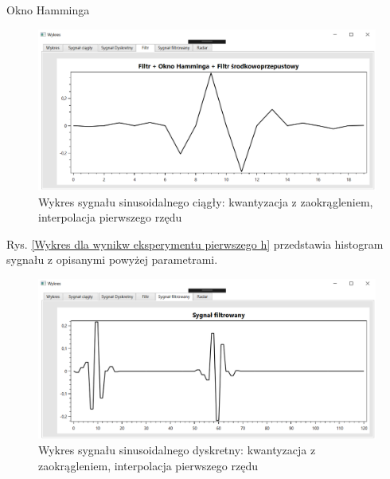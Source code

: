 \documentclass[12pt]{article}
\begin{document}
\newpage
Okno Hamminga
\begin{figure}[h!]
 \centering
 \includegraphics[width=12.3cm]{prostFSOHm.PNG}
 \vspace{-0.3cm}
 \caption{Wykres sygnału sinusoidalnego ciągły: kwantyzacja z zaokrągleniem, interpolacja pierwszego rzędu}
 \label{Wykres dla wyników eksperymentu drugiego}
\end{figure}
\newpage
Rys. \ref{Wykres dla wynikw eksperymentu pierwszego h} przedstawia histogram sygnału z opisanymi powyżej parametrami. 
\begin{figure}[h!]
 \centering
 \includegraphics[width=12.3cm]{prostSFSHm.PNG}
 \vspace{-0.3cm}
 \caption{Wykres sygnału sinusoidalnego dyskretny: kwantyzacja z zaokrągleniem, interpolacja pierwszego rzędu}
 \label{Histogram dla wyników eksperymentu drugiego}
\end{figure}
\end{document}
